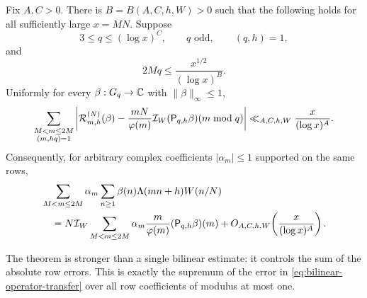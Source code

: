 \begin{theorem}
\label{thm:operator-transfer}
Fix $A,C>0$.  There is $B=B(A,C,h,W)>0$ such that the following holds for
all sufficiently large $x=MN$.  Suppose
\begin{equation}\label{eq:transfer-q-range}
 3\leq q\leq(\log x)^C,
 \qquad q\text{ odd},
 \qquad (q,h)=1,
\end{equation}
and
\begin{equation}\label{eq:transfer-modulus-range}
 2Mq\leq\frac{x^{1/2}}{(\log x)^B}.
\end{equation}
Uniformly for every $\beta:G_q\to\mathbb C$ with
$\|\beta\|_\infty\leq1$,
\begin{equation}\label{eq:l1-row-transfer}
 \sum_{\substack{M<m\leq2M\\(m,hq)=1}}
 \left|
  \mathcal R_{m,h}^{(N)}(\beta)
  -\frac{mN}{\varphi(m)}\mathcal I_W
   (\mathsf P_{q,h}\beta)(m\bmod q)
 \right|
 \ll_{A,C,h,W}\frac{x}{(\log x)^A}.
\end{equation}
Consequently, for arbitrary complex coefficients $|\alpha_m|\leq1$
supported on the same rows,
\begin{align}
 &\sum_{M<m\leq2M}\alpha_m
   \sum_{n\geq1}\beta(n)\Lambda(mn+h)W(n/N)
 \notag\\
 &\quad=
 N\mathcal I_W
 \sum_{M<m\leq2M}\alpha_m\frac{m}{\varphi(m)}
 (\mathsf P_{q,h}\beta)(m)
 +O_{A,C,h,W}\!\left(\frac{x}{(\log x)^A}\right).
 \label{eq:bilinear-operator-transfer}
\end{align}
\end{theorem}

The theorem is stronger than a single bilinear estimate: it controls the
sum of the absolute row errors.  This is exactly the supremum of the error
in \eqref{eq:bilinear-operator-transfer} over all row coefficients of modulus
at most one.

